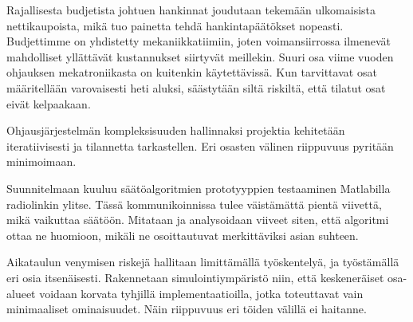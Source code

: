 \documentclass{article}
\begin{document}
Rajallisesta budjetista johtuen hankinnat joudutaan tekemään ulkomaisista nettikaupoista, mikä tuo painetta tehdä hankintapäätökset nopeasti. Budjettimme on yhdistetty mekaniikkatiimiin, joten voimansiirrossa ilmenevät mahdolliset yllättävät kustannukset siirtyvät meillekin. Suuri osa viime vuoden ohjauksen mekatroniikasta on kuitenkin käytettävissä. Kun tarvittavat osat määritellään varovaisesti heti aluksi, säästytään siltä riskiltä, että tilatut osat eivät kelpaakaan.

Ohjausjärjestelmän kompleksisuuden hallinnaksi projektia kehitetään iteratiivisesti ja tilannetta tarkastellen. Eri osasten välinen riippuvuus pyritään minimoimaan.

Suunnitelmaan kuuluu säätöalgoritmien prototyyppien testaaminen Matlabilla radiolinkin ylitse. Tässä kommunikoinnissa tulee väistämättä pientä viivettä, mikä vaikuttaa säätöön. Mitataan ja analysoidaan viiveet siten, että algoritmi ottaa ne huomioon, mikäli ne osoittautuvat merkittäviksi asian suhteen.

Aikataulun venymisen riskejä hallitaan limittämällä työskentelyä, ja työstämällä eri osia itsenäisesti. Rakennetaan simulointiympäristö niin, että keskeneräiset osa-alueet voidaan korvata tyhjillä implementaatioilla, jotka toteuttavat vain minimaaliset ominaisuudet. Näin riippuvuus eri töiden välillä ei haitanne.
\end{document}
